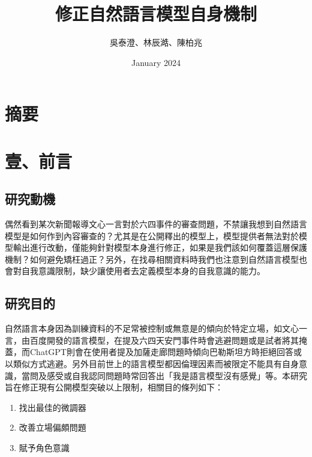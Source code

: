 \documentclass[8pt,a4paper,新細明體,UTF8,natbib]{article}
\title{修正自然語言模型自身機制}
\author{吳泰澄、林辰澔、陳柏兆}
\date{January 2024}
\begin{document}
\begin{CJK*}{UTF8}{bsmi}
	
	\maketitle{}
	\newpage
	\tableofcontents
	\newpage
	\section{摘要}

	\section{壹、前言}
	\subsection{研究動機}
	偶然看到某次新聞報導文心一言對於六四事件的審查問題，不禁讓我想到自然語言模型是如何作到內容審查的？尤其是在公開釋出的模型上，模型提供者無法對於模型輸出進行改動，僅能夠針對模型本身進行修正，如果是我們該如何覆蓋這層保護機制？如何避免矯枉過正？另外，在找尋相關資料時我們也注意到自然語言模型也會對自我意識限制，缺少讓使用者去定義模型本身的自我意識的能力。
	\subsection{研究目的}
	自然語言本身因為訓練資料的不足常被控制或無意是的傾向於特定立場，如文心一言，由百度開發的語言模型，在提及六四天安門事件時會逃避問題或是試者將其掩蓋，而ChatGPT則會在使用者提及加薩走廊問題時傾向巴勒斯坦方時拒絕回答或以類似方式逃避。另外目前世上的語言模型都因倫理因素而被限定不能具有自身意識，當問及感受或自我認同問題時常回答出「我是語言模型沒有感覺」等。本研究旨在修正現有公開模型突破以上限制，相關目的條列如下：
	\begin{enumerate}
		\item 找出最佳的微調器
		\item 改善立場偏頗問題
		\item 賦予角色意識
	\end{enumerate}

\end{CJK*}
\end{document}

